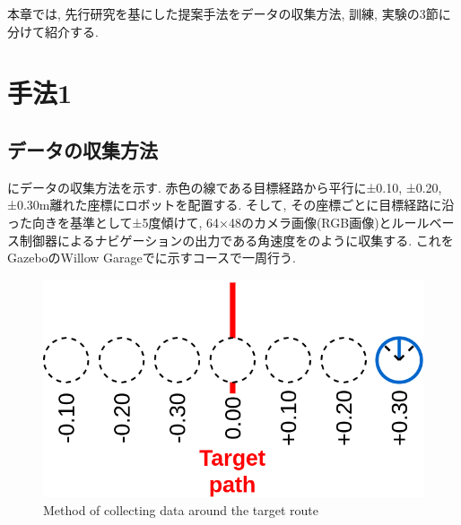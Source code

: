 
本章では, 先行研究を基にした提案手法をデータの収集方法, 訓練, 実験の3節に分けて紹介する.

\section{手法1}

\subsection{データの収集方法}
にデータの収集方法を示す. 赤色の線である目標経路から平行に±0.10, ±0.20, ±0.30m離れた座標にロボットを配置する. そして, その座標ごとに目標経路に沿った向きを基準として±5度傾けて, 64×48のカメラ画像(RGB画像)とルールベース制御器によるナビゲーションの出力である角速度をのように収集する. これをGazeboのWillow Garageでに示すコースで一周行う.


\begin{figure}[h]
  \centering
  \includegraphics[keepaspectratio, scale=0.25]{images/old-method.png}
  \caption{Method of collecting data around the target route}
  \label{Fig:old-method}
  \end{figure}

